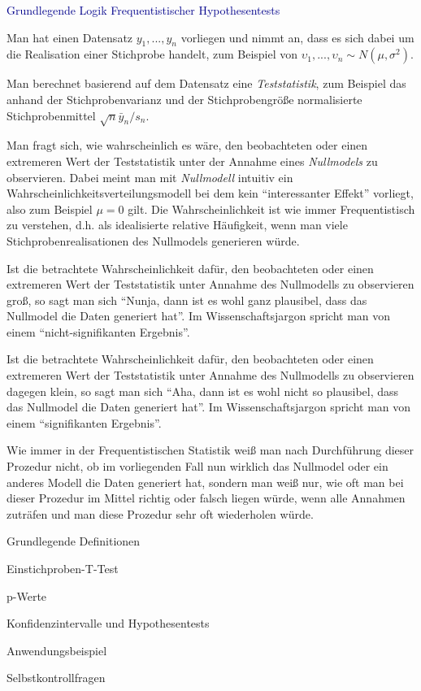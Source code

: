 \documentclass[
  8pt,
  ignorenonframetext,
]{beamer}
\newcommand{\ups} {\upsilon}
\begin{document}
\begin{frame}{}
\protect\hypertarget{section-5}{}
\textcolor{darkblue}{Grundlegende Logik Frequentistischer Hypothesentests}

\footnotesize

\justifying Man hat einen Datensatz \(y_1,...,y_n\) vorliegen und nimmt
an, dass es sich dabei um die Realisation einer Stichprobe handelt, zum
Beispiel von \(\ups_1,...,\ups_n \sim N(\mu,\sigma^2)\).

Man berechnet basierend auf dem Datensatz eine \emph{Teststatistik}, zum
Beispiel das anhand der Stichprobenvarianz und der Stichprobengröße
normalisierte Stichprobenmittel \(\sqrt{n}\bar{y}_n/s_n\).

Man fragt sich, wie wahrscheinlich es wäre, den beobachteten oder einen
extremeren Wert der Teststatistik unter der Annahme eines
\emph{Nullmodels} zu observieren. Dabei meint man mit \emph{Nullmodell}
intuitiv ein Wahrscheinlichkeitsverteilungsmodell bei dem kein
``interessanter Effekt'' vorliegt, also zum Beispiel \(\mu = 0\) gilt.
Die Wahrscheinlichkeit ist wie immer Frequentistisch zu verstehen, d.h.
als idealisierte relative Häufigkeit, wenn man viele
Stichprobenrealisationen des Nullmodels generieren würde.

Ist die betrachtete Wahrscheinlichkeit dafür, den beobachteten oder
einen extremeren Wert der Teststatistik unter Annahme des Nullmodells zu
observieren groß, so sagt man sich ``Nunja, dann ist es wohl ganz
plausibel, dass das Nullmodel die Daten generiert hat''. Im
Wissenschaftsjargon spricht man von einem ``nicht-signifikanten
Ergebnis''.

Ist die betrachtete Wahrscheinlichkeit dafür, den beobachteten oder
einen extremeren Wert der Teststatistik unter Annahme des Nullmodells zu
observieren dagegen klein, so sagt man sich ``Aha, dann ist es wohl
nicht so plausibel, dass das Nullmodel die Daten generiert hat''. Im
Wissenschaftsjargon spricht man von einem ``signifikanten Ergebnis''.

Wie immer in der Frequentistischen Statistik weiß man nach Durchführung
dieser Prozedur nicht, ob im vorliegenden Fall nun wirklich das
Nullmodel oder ein anderes Modell die Daten generiert hat, sondern man
weiß nur, wie oft man bei dieser Prozedur im Mittel richtig oder falsch
liegen würde, wenn alle Annahmen zuträfen und man diese Prozedur sehr
oft wiederholen würde.
\end{frame}

\begin{frame}{}
\protect\hypertarget{section-6}{}
\large
\vfill

Grundlegende Definitionen

Einstichproben-T-Test

p-Werte

Konfidenzintervalle und Hypothesentests

Anwendungsbeispiel

Selbstkontrollfragen \vfill
\end{frame}
\end{document}
